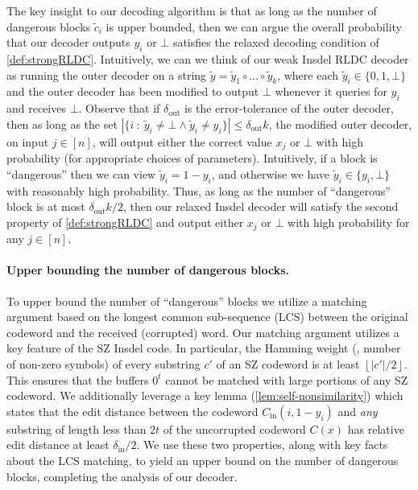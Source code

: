 \documentclass[10pt,a4paper]{article}
\theoremstyle{remark}
\newcommand{\ie}{\text{i.e.}\xspace}
\newcommand{\floor}[1]{\ensuremath{\left\lfloor{#1}\right\rfloor}\xspace}
\newcommand{\authnote}[3]{\textcolor{#2}{{\sf (#1's Note: {\sl{#3}})}}}
\newcommand{\alex}[1]{\authnote{Alex}{orange}{#1}}
\newcommand{\authnote}{}
\newcommand{\alex}[1]{}
\newcommand{\tildey}{\ensuremath{\widetilde{y}}\xspace}
\newcommand{\tildec}{\ensuremath{\widetilde{c}}\xspace}
\newcommand{\tildeY}{\ensuremath{\widetilde{Y}}\xspace}
\newcommand{\dout}{\delta_{\text{out}}}
\newcommand{\Cin}{C_{\text{in}}}
\newcommand{\din}{\delta_{\text{in}}}
\begin{document}
The key insight to our decoding algorithm is that as long as the number of dangerous blocks $\tildec_i$ is upper bounded, then we can argue the overall probability that our decoder outputs $y_i$ or $\bot$ satisfies the relaxed decoding condition of \cref{def:strongRLDC}.
Intuitively, we can we think of our weak Insdel RLDC decoder as running the outer decoder on a string $\tilde{y} = \tilde{y}_1 \circ \ldots \circ \tilde{y}_k$, where each $\tilde{y}_i \in \{0,1,\bot\}$ and the outer decoder has been modified to output $\bot$ whenever it queries for $y_i$ and receives $\bot$. 
Observe that if $\dout$ is the error-tolerance of the outer decoder, then as long as the set $\left| \{ i ~:~\tildey_i \neq \bot \wedge \tildey_i \neq y_i \} \right| \leq \dout k$, the modified outer decoder, on input $j \in [n]$, will output either the correct value $x_j$ or $\bot$ with high probability %
(for appropriate choices of parameters). 
Intuitively, if a block is ``dangerous'' then we can view $\tildey_i = 1- y_i$, and otherwise we have $\tildey_i \in \{y_i, \bot\}$ with reasonably high probability. 
Thus, as long as the number of ``dangerous'' block is at most $\dout k/2$, then our relaxed Insdel decoder will satisfy the second property of \cref{def:strongRLDC} and output either $x_j$ or $\bot$ with high probability %
for any $j \in [n]$.

\paragraph{Upper bounding the number of dangerous blocks.}
To upper bound the number of ``dangerous'' blocks we utilize a matching argument based on the longest common sub-sequence (LCS) between the original codeword and the received (corrupted) word. 
Our matching argument utilizes a key feature of the SZ Insdel code. 
In particular, the Hamming weight (\ie, number of non-zero symbols) of every substring $c'$ of an SZ codeword is at least $\floor{|c'|/2}$. %
This ensures that the buffers $0^t$ cannot be matched with large portions of any SZ codeword. 
We additionally leverage a key lemma (\cref{lem:self-nonsimilarity}) which states that the edit distance between the codeword $\Cin(i,1-y_i)$ and \emph{any} substring of length less than $2t$ of the uncorrupted codeword $C(x)$ has relative edit distance at least $\din/2$.
We use these two properties, along with key facts about the LCS matching, to yield an upper bound on the number of dangerous blocks, completing the analysis of our decoder.
\end{document}
